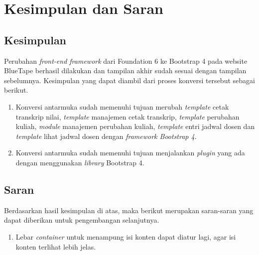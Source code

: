 \chapter{Kesimpulan dan Saran}
\section{Kesimpulan}
Perubahan \textit{front-end framework} dari Foundation 6 ke Bootstrap 4 pada website BlueTape berhasil dilakukan dan tampilan akhir sudah sesuai dengan tampilan sebelumnya. Kesimpulan yang dapat diambil dari proses konversi tersebut sebagai berikut. 
\begin{enumerate}
	\item Konversi antarmuka sudah memenuhi tujuan merubah \textit{template} cetak transkrip nilai, \textit{template} manajemen cetak transkrip, \textit{template} perubahan kuliah, \textit{module} manajemen perubahan kuliah, \textit{template} entri jadwal dosen dan \textit{template} lihat jadwal dosen dengan \textit{framework Bootstrap 4}.
	\item Konversi antarmuka sudah memenuhi tujuan menjalankan \textit{plugin} yang ada dengan menggunakan \textit{library} Bootstrap 4.
\end{enumerate}


\section{Saran}
Berdasarkan hasil kesimpulan di atas, maka berikut merupakan saran-saran yang dapat diberikan untuk pengembangan selanjutnya.
\begin{enumerate}
	\item Lebar \textit{container} untuk menampung isi konten dapat diatur lagi, agar isi konten terlihat lebih jelas.
\end{enumerate}